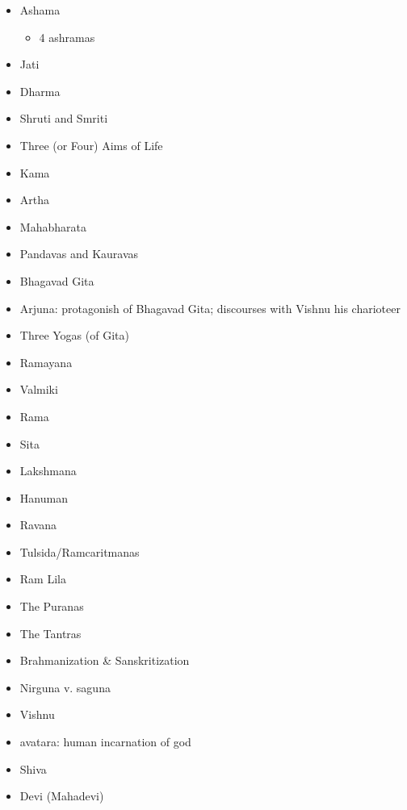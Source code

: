 \documentclass[11pt]{article} %
\begin{document}
\begin{itemize}
\item
Ashama
\begin{itemize}
\item 4 ashramas
\end{itemize}

\item
Jati

\item
Dharma

\item
Shruti and Smriti

\item
Three (or Four) Aims of Life

\item
Kama

\item
Artha

\item
Mahabharata

\item
Pandavas and Kauravas

\item
Bhagavad Gita

\item
Arjuna: protagonish of Bhagavad Gita; discourses with Vishnu his charioteer

\item
Three Yogas (of Gita)

\item
Ramayana

\item
Valmiki

\item
Rama

\item
Sita

\item
Lakshmana

\item
Hanuman

\item
Ravana

\item
Tulsida/Ramcaritmanas

\item
Ram Lila

\item
The Puranas

\item
The Tantras

\item
Brahmanization \& Sanskritization

\item
Nirguna v. saguna

\item
Vishnu

\item
avatara: human incarnation of god

\item
Shiva

\item
Devi (Mahadevi)

\end{itemize}
\end{document}
